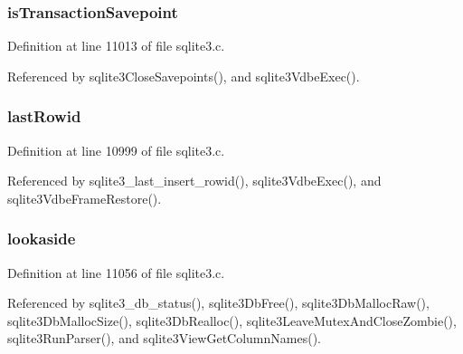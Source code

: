 \hypertarget{structsqlite3_a9de1db025ba0b992188929a11ae8f2d6}{}
\subsubsection[{is\+Transaction\+Savepoint}]{ is\+Transaction\+Savepoint}\label{structsqlite3_a9de1db025ba0b992188929a11ae8f2d6}


Definition at line 11013 of file sqlite3.\+c.



Referenced by sqlite3\+Close\+Savepoints(), and sqlite3\+Vdbe\+Exec().

\hypertarget{structsqlite3_ac7e3735a03635ad8ee39c159a889a920}{}
\subsubsection[{last\+Rowid}]{ last\+Rowid}\label{structsqlite3_ac7e3735a03635ad8ee39c159a889a920}


Definition at line 10999 of file sqlite3.\+c.



Referenced by sqlite3\+\_\+last\+\_\+insert\+\_\+rowid(), sqlite3\+Vdbe\+Exec(), and sqlite3\+Vdbe\+Frame\+Restore().

\hypertarget{structsqlite3_a856ae4d08abfaa41927fa687c047b0cf}{}
\subsubsection[{lookaside}]{ lookaside}\label{structsqlite3_a856ae4d08abfaa41927fa687c047b0cf}


Definition at line 11056 of file sqlite3.\+c.



Referenced by sqlite3\+\_\+db\+\_\+status(), sqlite3\+Db\+Free(), sqlite3\+Db\+Malloc\+Raw(), sqlite3\+Db\+Malloc\+Size(), sqlite3\+Db\+Realloc(), sqlite3\+Leave\+Mutex\+And\+Close\+Zombie(), sqlite3\+Run\+Parser(), and sqlite3\+View\+Get\+Column\+Names().

\hypertarget{structsqlite3_a1c2f2992893a71ac0ee3f43477000176}{}
